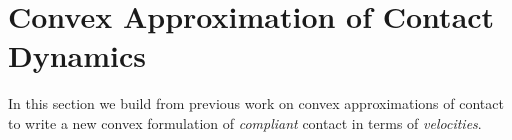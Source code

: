 
\section{Convex Approximation of Contact Dynamics}
\label{sec:convex_approximation}

In this section we build from previous work on convex approximations of contact
\cite{bib:anitescu2006, bib:todorov2011, bib:todorov2014} to write a new convex
formulation of \emph{compliant} contact in terms of \emph{velocities}.




